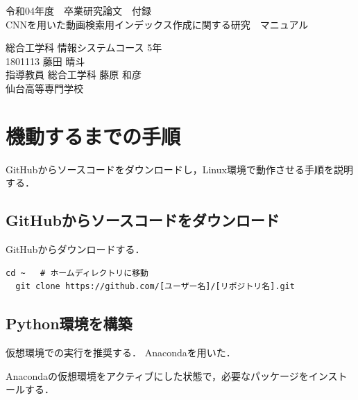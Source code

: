 \documentclass[a4j,12pt,dvipdfmx]{jreport}
\begin{document}
\begin{titlepage} \centering
  \null \null
  \vspace{10mm}
  令和04年度　卒業研究論文　付録\\
  \vspace{55.15mm}
  \null
  {\Large CNNを用いた動画検索用インデックス作成に関する研究　マニュアル}\\
  
  \vspace{82.5mm}
  
  \large
  総合工学科 情報システムコース 5年\\[1mm]
  1801113 藤田 晴斗\\[1mm]
  指導教員 総合工学科 藤原 和彦\\
  
  \vspace{16mm}
  {仙台高等専門学校}
  \null

\end{titlepage}

\tableofcontents
\large
\renewcommand{\baselinestretch}{1.1}
\appendix
\chapter{機動するまでの手順}
GitHubからソースコードをダウンロードし，Linux環境で動作させる手順を説明する．

\section{GitHubからソースコードをダウンロード}
GitHubからダウンロードする．
\begin{lstlisting}[caption=hoge,label=fuga]
  cd ~   # ホームディレクトリに移動
  git clone https://github.com/[ユーザー名]/[リポジトリ名].git
\end{lstlisting}

\section{Python環境を構築}
仮想環境での実行を推奨する．
Anacondaを用いた．

Anacondaの仮想環境をアクティブにした状態で，必要なパッケージをインストールする．
\begin{lstlisting}[caption=hoge,label=fuga]

\end{lstlisting}
\end{document}
